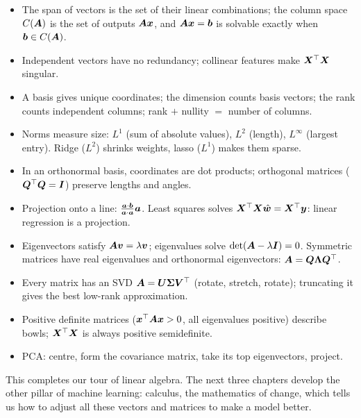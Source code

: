 \begin{keytakeaways}
\begin{itemize}
  \item The span of vectors is the set of their linear combinations; the column
    space $C(\bm{A})$ is the set of outputs $\bm{A}\bm{x}$, and $\bm{A}\bm{x} = \bm{b}$ is
    solvable exactly when $\bm{b} \in C(\bm{A})$.
  \item Independent vectors have no redundancy; collinear features make
    $\bm{X}^\top\bm{X}$ singular.
  \item A basis gives unique coordinates; the dimension counts basis vectors;
    the rank counts independent columns; rank $+$ nullity $=$ number of columns.
  \item Norms measure size: $L^1$ (sum of absolute values), $L^2$ (length),
    $L^\infty$ (largest entry). Ridge ($L^2$) shrinks weights, lasso ($L^1$)
    makes them sparse.
  \item In an orthonormal basis, coordinates are dot products; orthogonal
    matrices ($\bm{Q}^\top\bm{Q} = \bm{I}$) preserve lengths and angles.
  \item Projection onto a line: $\frac{\bm{a}\cdot\bm{b}}{\bm{a}\cdot\bm{a}}\bm{a}$. Least
    squares solves $\bm{X}^\top\bm{X}\hat{\bm{w}} = \bm{X}^\top\bm{y}$: linear regression is a
    projection.
  \item Eigenvectors satisfy $\bm{A}\bm{v} = \lambda\bm{v}$; eigenvalues solve
    $\det(\bm{A} - \lambda\bm{I}) = 0$. Symmetric matrices have real eigenvalues and
    orthonormal eigenvectors: $\bm{A} = \bm{Q}\bm{\Lambda}\bm{Q}^\top$.
  \item Every matrix has an SVD $\bm{A} = \bm{U}\bm{\Sigma}\bm{V}^\top$ (rotate, stretch,
    rotate); truncating it gives the best low-rank approximation.
  \item Positive definite matrices ($\bm{x}^\top\bm{A}\bm{x} > 0$, all eigenvalues
    positive) describe bowls; $\bm{X}^\top\bm{X}$ is always positive semidefinite.
  \item PCA: centre, form the covariance matrix, take its top eigenvectors,
    project.
\end{itemize}
\end{keytakeaways}

This completes our tour of linear algebra. The next three chapters develop the
other pillar of machine learning: calculus, the mathematics of change, which
tells us how to adjust all these vectors and matrices to make a model better.
